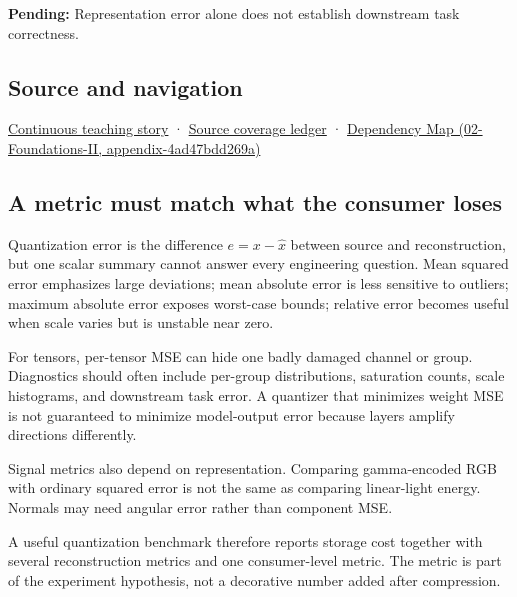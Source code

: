 \textbf{Pending:} Representation error alone does not establish downstream task correctness.

\subsection{Source and navigation}\label{source-and-navigation}

\href{Continuous\%20Notes/Computing\%20Foundations\%20-\%20From\%20Bits\%20to\%20C++\%20and\%20Systems\%20APIs\#Choosing\%20what\%20information\%20to\%20keep}{Continuous teaching story} · \hyperref[appendix-fd090d982a15]{Source coverage ledger} · \href{}{Dependency Map (02-Foundations-II, appendix-4ad47bdd269a)}

\subsection{A metric must match what the consumer loses}\label{a-metric-must-match-what-the-consumer-loses}

Quantization error is the difference \(e=x-\hat x\) between source and reconstruction, but one scalar summary cannot answer every engineering question. Mean squared error emphasizes large deviations; mean absolute error is less sensitive to outliers; maximum absolute error exposes worst-case bounds; relative error becomes useful when scale varies but is unstable near zero.

For tensors, per-tensor MSE can hide one badly damaged channel or group. Diagnostics should often include per-group distributions, saturation counts, scale histograms, and downstream task error. A quantizer that minimizes weight MSE is not guaranteed to minimize model-output error because layers amplify directions differently.

Signal metrics also depend on representation. Comparing gamma-encoded RGB with ordinary squared error is not the same as comparing linear-light energy. Normals may need angular error rather than component MSE.

A useful quantization benchmark therefore reports storage cost together with several reconstruction metrics and one consumer-level metric. The metric is part of the experiment hypothesis, not a decorative number added after compression.
